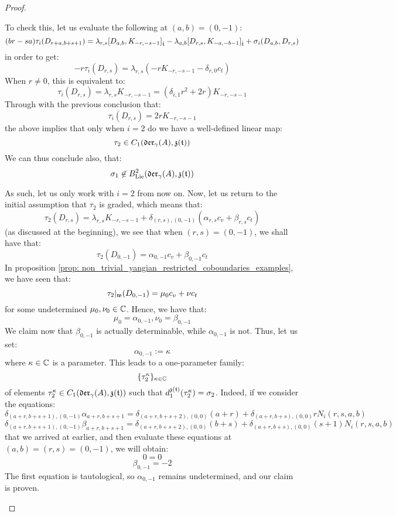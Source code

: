 \begin{proof}
\begin{enumerate}
                    To check this, let us evaluate the following at $(a, b) = (0, -1)$:
                        $$(br - sa) \tau_i( D_{r + a, b + s + 1} ) = \lambda_{r, s} [D_{a, b}, K_{-r, -s - 1}]_{\hat{\mathfrak{t}}} - \lambda_{a, b} [D_{r, s}, K_{-a, -b - 1}]_{\hat{\mathfrak{t}}} + \sigma_i(D_{a, b}, D_{r, s})$$
                    in order to get:
                        $$-r \tau_i(D_{r, s}) = \lambda_{r, s}\left( -r K_{-r, -s - 1} - \delta_{r, 0} c_t \right)$$
                    When $r \not = 0$, this is equivalent to:
                        $$\tau_i(D_{r, s}) = \lambda_{r, s} K_{-r, -s - 1} = ( \delta_{i, 1} r^2 + 2r ) K_{-r, -s - 1}$$
                    Through with the previous conclusion that:
                        $$\tau_i(D_{r, s}) = 2r K_{-r, -s - 1}$$
                    the above implies that only when $i = 2$ do we have a well-defined linear map:
                        $$\tau_2 \in C_1( \mathfrak{der}_{\gamma}(A), \mathfrak{z}(\mathfrak{t}) )$$
                    We can thus conclude also, that:
                        $$\sigma_1 \not \in B^2_{\mathrm{Lie}}( \mathfrak{der}_{\gamma}(A), \mathfrak{z}(\mathfrak{t}) )$$

                    As such, let us only work with $i = 2$ from now on. Now, let us return to the initial assumption that $\tau_2$ is graded, which means that:
                        $$\tau_2(D_{r, s}) = \lambda_{r, s} K_{-r, -s - 1} + \delta_{(r, s), (0, -1)} ( \alpha_{r, s} c_v + \beta_{r, s} c_t )$$
                    (as discussed at the beginning), we see that when $(r, s) = (0, -1)$, we shall have that:
                        $$\tau_2(D_{0, -1}) = \alpha_{0, -1} c_v + \beta_{0, -1} c_t$$
                    In proposition \ref{prop: non_trivial_yangian_restricted_coboundaries_examples}, we have seen that:
                        $$\tau_2|_{\mathfrak{w}}(D_{0, -1}) = \mu_0 c_v + \nu c_t$$
                    for some undetermined $\mu_0, \nu_0 \in \mathbb{C}$. Hence, we have that:
                        $$\mu_0 = \alpha_{0, -1}, \nu_0 = \beta_{0, -1}$$
                    We claim now that $\beta_{0, -1}$ is actually determinable, while $\alpha_{0, -1}$ is not. Thus, let us set:
                        $$\alpha_{0, -1} := \kappa$$
                    where $\kappa \in \mathbb{C}$ is a parameter. This leads to a one-parameter family:
                        $$\{\tau_2^{\kappa}\}_{\kappa \in \mathbb{C}}$$
                    of elements $\tau_2^{\kappa} \in C_1(\mathfrak{der}_{\gamma}(A), \mathfrak{z}(\mathfrak{t}))$ such that $d_1^{\mathfrak{z}(\mathfrak{t})}(\tau_2^{\kappa}) = \sigma_2$. Indeed, if we consider the equations:
                        $$\delta_{(a + r, b + s + 1), (0, -1)} \alpha_{a + r, b + s + 1} = \delta_{(a + r, b + s + 2), (0, 0)} (a + r) + \delta_{(a + r, b + s), (0, 0)} r N_i(r, s, a, b)$$
                        $$\delta_{(a + r, b + s + 1), (0, -1)} \beta_{a + r, b + s + 1} = \delta_{(a + r, b + s + 2), (0, 0)} (b + s) + \delta_{(a + r, b + s), (0, 0)} (s + 1) N_i(r, s, a, b)$$
                    that we arrived at earlier, and then evaluate these equations at $(a, b) = (r, s) = (0, -1)$, we will obtain:
                        $$0 = 0$$
                        $$\beta_{0, -1} = -2$$
                    The first equation is tautological, so $\alpha_{0, -1}$ remains undetermined, and our claim is proven.


\end{enumerate}
\end{proof}
